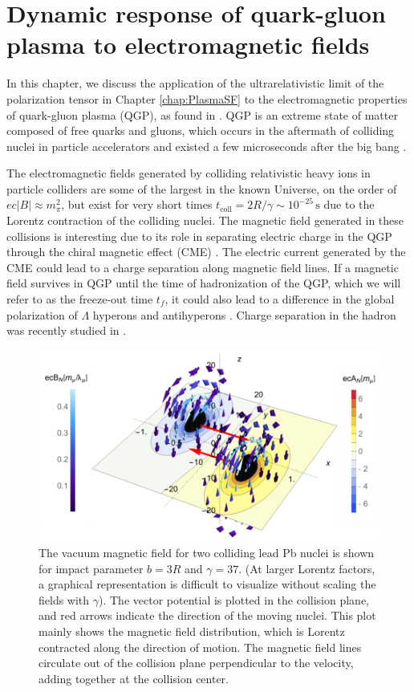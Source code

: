\chapter{Dynamic response of quark-gluon plasma to electromagnetic fields}\label{chap:QCD}

 In this chapter, we discuss the application of the ultrarelativistic limit of the polarization tensor in Chapter \ref{chap:PlasmaSF} to the electromagnetic properties of quark-gluon plasma (QGP), as found in \cite{Grayson:2022asf}. QGP is an extreme state of matter composed of free quarks and gluons, which occurs in the aftermath of colliding nuclei in particle accelerators and existed a few microseconds after the big bang \cite{Letessier:2002ony}. 

The electromagnetic fields generated by colliding relativistic heavy ions in particle colliders are some of the largest in the known Universe, on the order of $ec|B| \approx m_\pi^2$, but exist for very short times $t_{\text{coll}}= 2 R/\gamma \sim 10^{-25}\,\textrm{s}$ due to the Lorentz contraction of the colliding nuclei. The magnetic field generated in these collisions is interesting due to its role in separating electric charge in the QGP through the chiral magnetic effect (CME) \cite{Kharzeev:2007jp}. The electric current generated by the CME could lead to a charge separation along magnetic field lines. If a magnetic field survives in QGP until the time of hadronization of the QGP, which we will refer to as the freeze-out time $t_f$, it could also lead to a difference in the global polarization of $\Lambda$ hyperons and antihyperons \cite{Muller:2018ibh}. Charge separation in the hadron was recently studied in \cite{PhysRevX.14.011028}. 

\begin{figure}[h!]
    \centering
    \includegraphics[width=0.85\linewidth]{plots/chap02QCD/Bfield.png}
    \caption{The vacuum magnetic field for two colliding lead Pb nuclei is shown for impact parameter $b=3R$ and $\gamma =37$. (At larger Lorentz factors, a graphical representation is difficult to visualize without scaling the fields with $\gamma$). The vector potential is plotted in the collision plane, and red arrows indicate the direction of the moving nuclei. This plot mainly shows the magnetic field distribution, which is Lorentz contracted along the direction of motion. The magnetic field lines circulate out of the collision plane perpendicular to the velocity, adding together at the collision center.  }
    \label{fig:vacmag}
\end{figure}

